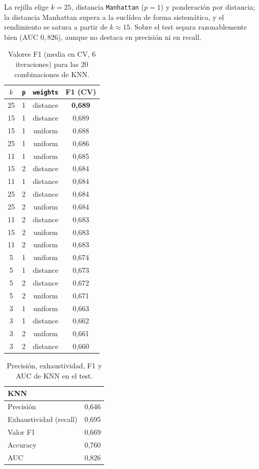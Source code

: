 \documentclass[12pt,a4paper]{report}
\theoremstyle{definition}
\newcommand{\tc}[1]{\texttt{#1}}
\begin{document}
La rejilla elige $k=25$, distancia
\tc{Manhattan} ($p=1$) y ponderación por distancia; la distancia Manhattan supera a la
euclídea de forma sistemática, y el rendimiento se satura a partir de $k\approx15$. Sobre el
test separa razonablemente bien
(AUC $0{,}826$), aunque no destaca en precisión ni en recall.

\begin{table}[H]
\centering\footnotesize
\begin{tabular}{cccc}
\toprule
$k$ & \tc{p} & \tc{weights} & F1 (CV) \\
\midrule
25 & 1 & distance & \textbf{0,689} \\
15 & 1 & distance & 0,689 \\
15 & 1 & uniform & 0,688 \\
25 & 1 & uniform & 0,686 \\
11 & 1 & uniform & 0,685 \\
15 & 2 & distance & 0,684 \\
11 & 1 & distance & 0,684 \\
25 & 2 & distance & 0,684 \\
25 & 2 & uniform & 0,684 \\
11 & 2 & distance & 0,683 \\
15 & 2 & uniform & 0,683 \\
11 & 2 & uniform & 0,683 \\
5 & 1 & uniform & 0,674 \\
5 & 1 & distance & 0,673 \\
5 & 2 & distance & 0,672 \\
5 & 2 & uniform & 0,671 \\
3 & 1 & uniform & 0,663 \\
3 & 1 & distance & 0,662 \\
3 & 2 & uniform & 0,661 \\
3 & 2 & distance & 0,660 \\
\bottomrule
\end{tabular}
\caption{Valores F1 (media en CV, 6 iteraciones) para las 20 combinaciones de KNN.}
\label{tab:grid-knn}
\end{table}

\begin{table}[H]
\centering\small
\begin{tabular}{lc}
\toprule
KNN & \\
\midrule
Precisión & 0,646 \\
Exhaustividad (recall) & 0,695 \\
Valor F1 & 0,669 \\
Accuracy & 0,760 \\
AUC & 0,826 \\
\bottomrule
\end{tabular}
\caption{Precisión, exhaustividad, F1 y AUC de KNN en el test.}
\label{tab:met-knn}
\end{table}
\end{document}
